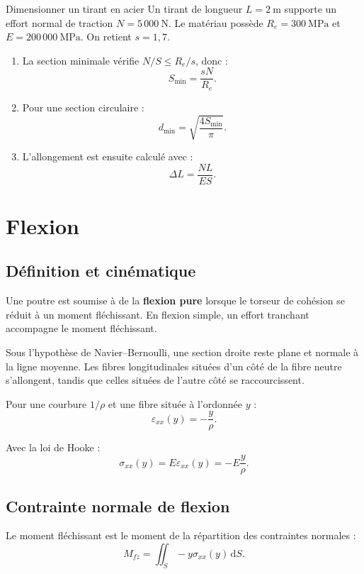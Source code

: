 \begin{TLMethod}{Dimensionner un tirant en acier}
Un tirant de longueur $L=2\ \mathrm m$ supporte un effort normal de traction $N=5\,000\ \mathrm N$. Le matériau possède $R_e=300\ \mathrm{MPa}$ et $E=200\,000\ \mathrm{MPa}$. On retient $s=1{,}7$.

\begin{enumerate}
  \item La section minimale vérifie $N/S\leq R_e/s$, donc :
  \[
  S_{\min}=\frac{sN}{R_e}.
  \]
  \item Pour une section circulaire :
  \[
  d_{\min}=\sqrt{\frac{4S_{\min}}{\pi}}.
  \]
  \item L'allongement est ensuite calculé avec :
  \[
  \Delta L=\frac{NL}{ES}.
  \]
\end{enumerate}
\end{TLMethod}

\section{Flexion}
\label{sec:rdm-6}

\subsection{Définition et cinématique}

Une poutre est soumise à de la \textbf{flexion pure} lorsque le torseur de cohésion se réduit à un moment fléchissant. En flexion simple, un effort tranchant accompagne le moment fléchissant.

Sous l'hypothèse de Navier--Bernoulli, une section droite reste plane et normale à la ligne moyenne. Les fibres longitudinales situées d'un côté de la fibre neutre s'allongent, tandis que celles situées de l'autre côté se raccourcissent.

Pour une courbure $1/\rho$ et une fibre située à l'ordonnée $y$ :
\[
\varepsilon_{xx}(y)=-\frac{y}{\rho}.
\]

Avec la loi de Hooke :
\[
\sigma_{xx}(y)=E\varepsilon_{xx}(y)=-E\frac{y}{\rho}.
\]

\TLDistributionContrainteFlexion

\subsection{Contrainte normale de flexion}

Le moment fléchissant est le moment de la répartition des contraintes normales :
\[
M_{fz}=\iint_S -y\sigma_{xx}(y)\,\mathrm dS.
\]


